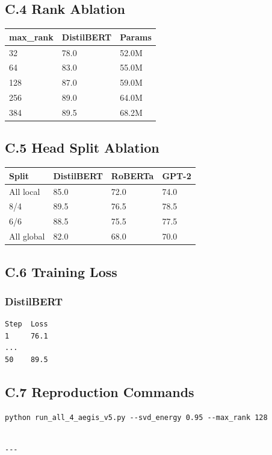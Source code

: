 \subsection{C.4 Rank Ablation}

\begin{table}[H]
\centering
\small
\begin{tabular}{lll}
\toprule
\textbf{max\_rank} & \textbf{DistilBERT} & \textbf{Params} \\
\midrule
32 & 78.0 & 52.0M \\
64 & 83.0 & 55.0M \\
128 & 87.0 & 59.0M \\
256 & 89.0 & 64.0M \\
384 & 89.5 & 68.2M \\
\bottomrule
\end{tabular}
\end{table}

\subsection{C.5 Head Split Ablation}

\begin{table}[H]
\centering
\small
\begin{tabular}{llll}
\toprule
\textbf{Split} & \textbf{DistilBERT} & \textbf{RoBERTa} & \textbf{GPT-2} \\
\midrule
All local & 85.0 & 72.0 & 74.0 \\
8/4 & 89.5 & 76.5 & 78.5 \\
6/6 & 88.5 & 75.5 & 77.5 \\
All global & 82.0 & 68.0 & 70.0 \\
\bottomrule
\end{tabular}
\end{table}

\subsection{C.6 Training Loss}

\subsubsection{DistilBERT}
\begin{lstlisting}
Step  Loss
1     76.1
...
50    89.5
\end{lstlisting}

\subsection{C.7 Reproduction Commands}

\begin{lstlisting}
python run_all_4_aegis_v5.py --svd_energy 0.95 --max_rank 128
\end{lstlisting}
\begin{lstlisting}

---
\end{lstlisting}